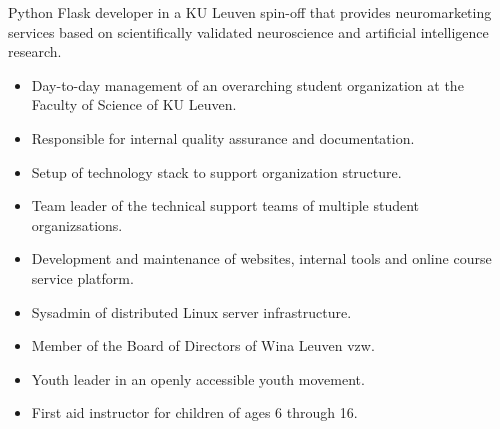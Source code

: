 \documentclass[10pt,a4paper,ragged2e]{altacv}
\begin{document}
    \divider


    Python Flask developer in a KU Leuven spin-off that provides neuromarketing services based on scientifically validated
    neuroscience and artificial intelligence research.

    \divider



    \divider



    \begin{itemize}
        \item Day-to-day management of an overarching student organization at the Faculty of Science of KU Leuven.
        \item Responsible for internal quality assurance and documentation.
        \item Setup of technology stack to support organization structure.
    \end{itemize}

    \divider


    \begin{itemize}
        \item Team leader of the technical support teams of multiple student organizsations.
        \item Development and maintenance of websites, internal tools and online course service platform.
        \item Sysadmin of distributed Linux server infrastructure.
        \item Member of the Board of Directors of Wina Leuven vzw.
    \end{itemize}

    \divider

    \begin{itemize}
        \item Youth leader in an openly accessible youth movement.
        \item First aid instructor for children of ages 6 through 16.
    \end{itemize}
\end{document}
